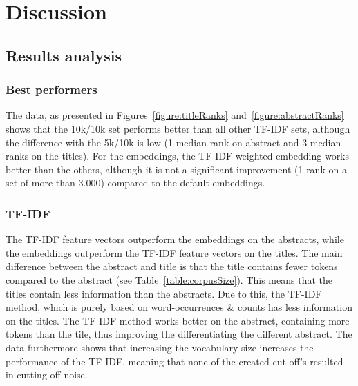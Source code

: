 \documentclass[../../Thesis.tex]{subfiles}
\begin{document}
\section{Discussion}
\subsection{Results analysis}
\subsubsection{Best performers}
The data, as presented in Figures~\ref{figure:titleRanks} and~\ref{figure:abstractRanks} shows that the 10k/10k set performs better than all other TF-IDF sets, although the difference with the 5k/10k is low (1 median rank on abstract and 3 median ranks on the titles). For the embeddings, the TF-IDF weighted embedding works better than the others, although it is not a significant improvement (1 rank on a set of more than 3.000) compared to the default embeddings.
\subsubsection{TF-IDF}
The TF-IDF feature vectors outperform the embeddings on the abstracts, while the embeddings outperform the TF-IDF feature vectors on the titles. The main difference between the abstract and title is that the title contains fewer tokens compared to the abstract (see Table~\ref{table:corpusSize}). This means that the titles contain less information than the abstracts. Due to this, the TF-IDF method, which is purely based on word-occurrences \& counts has less information on the titles. The TF-IDF method works better on the abstract, containing more tokens than the tile, thus improving the differentiating the different abstract. The data furthermore shows that increasing the vocabulary size increases the performance of the TF-IDF, meaning that none of the created cut-off's resulted in cutting off noise.
\end{document}
